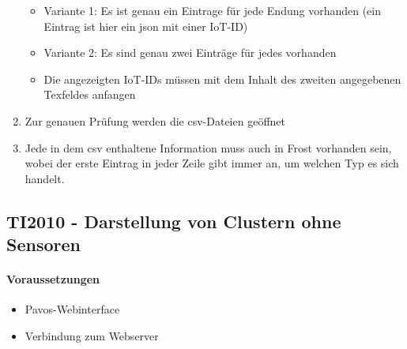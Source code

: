 \begin{enumerate}
\begin{itemize}
\item Variante 1: Es ist genau ein Eintrage für jede Endung vorhanden (ein Eintrag ist hier ein json mit einer IoT-ID)
\item Variante 2: Es sind genau zwei Einträge für jedes vorhanden
\item Die angezeigten IoT-IDs müssen mit dem Inhalt des zweiten angegebenen Texfeldes anfangen
\end{itemize}
\item Zur genauen Prüfung werden die csv-Dateien geöffnet
\item Jede in dem csv enthaltene Information muss auch in Frost vorhanden sein, wobei der erste Eintrag in jeder Zeile gibt immer an, um welchen Typ es sich handelt.
\end{enumerate}
\szenarioGood

\subsection{TI2010 - Darstellung von Clustern ohne Sensoren}
\paragraph{Voraussetzungen}
\begin{itemize}
\item Pavos-Webinterface
\item Verbindung zum Webserver
\end{itemize}
